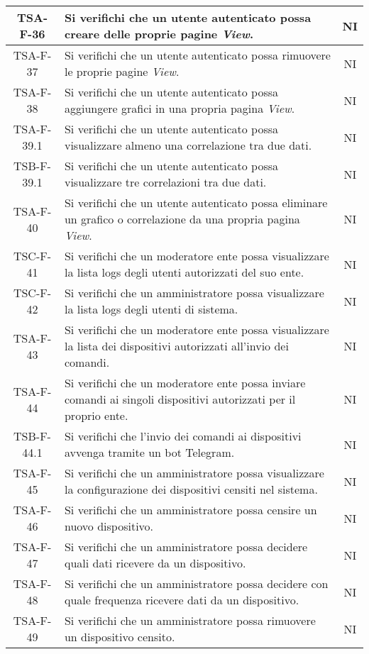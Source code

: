 \begin{center}
\begin{longtable}{|c|p{10cm}|c|}
			 \hline
			 TSA-F-36 & Si verifichi che un utente autenticato possa creare delle proprie pagine \textit{View}. & NI \\
			 \hline
			 TSA-F-37 & Si verifichi che un utente autenticato possa rimuovere le proprie pagine \textit{View}. & NI \\
			 \hline
			 TSA-F-38 & Si verifichi che un utente autenticato possa aggiungere grafici in una propria pagina  \textit{View}. & NI \\
			 \hline
			 TSA-F-39.1 & Si verifichi che un utente autenticato possa visualizzare almeno una correlazione tra due dati. & NI \\
			 \hline
			 TSB-F-39.1 & Si verifichi che un utente autenticato possa visualizzare tre correlazioni tra due dati. & NI \\
			 \hline
			 TSA-F-40 & Si verifichi che un utente autenticato possa eliminare un grafico o correlazione da una propria pagina \textit{View}. & NI \\
			 \hline
			 TSC-F-41 & Si verifichi che un moderatore ente possa visualizzare la lista logs degli utenti autorizzati del suo ente. & NI \\
			 \hline
			 TSC-F-42 & Si verifichi che un amministratore possa visualizzare la lista logs degli utenti di sistema. & NI \\
			 \hline
			 TSA-F-43 & Si verifichi che un moderatore ente possa visualizzare la lista dei dispositivi autorizzati all'invio dei comandi. & NI \\
			 \hline
			 TSA-F-44 & Si verifichi che un moderatore ente possa inviare comandi ai singoli dispositivi autorizzati per il proprio ente. & NI \\
			 \hline
			 TSB-F-44.1 & Si verifichi che l'invio dei comandi ai dispositivi avvenga tramite un bot Telegram. & NI \\
			 \hline
			 TSA-F-45 & Si verifichi che un amministratore possa visualizzare la configurazione dei dispositivi censiti nel sistema. & NI \\
			 \hline
			 TSA-F-46 & Si verifichi che un amministratore possa censire un nuovo dispositivo. & NI \\
			 \hline
			 TSA-F-47 & Si verifichi che un amministratore possa decidere quali dati ricevere da un dispositivo. & NI \\
			 \hline
			 TSA-F-48 & Si verifichi che un amministratore possa decidere con quale frequenza ricevere dati da un dispositivo. & NI \\
			 \hline
			 TSA-F-49 & Si verifichi che un amministratore possa rimuovere un dispositivo censito. & NI \\

\end{longtable}
\end{center}
